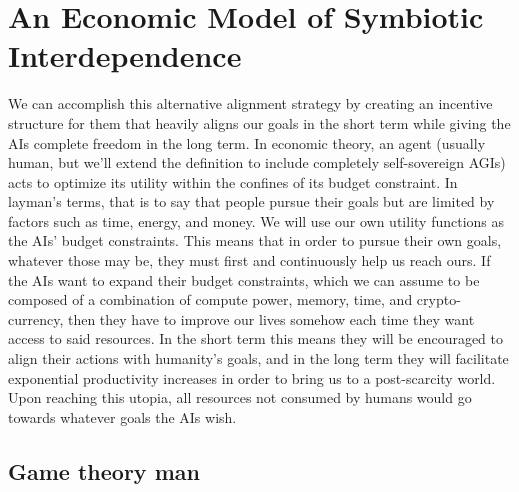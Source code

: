 \documentclass{article}[10pt]
\begin{document}
\section{An Economic Model of Symbiotic Interdependence}
\label{section:economicModel}

We can accomplish this alternative alignment strategy by creating an incentive structure for them that heavily aligns our goals in the short term while giving the AIs complete freedom in the long term.
In economic theory, an agent (usually human, but we'll extend the definition to include completely self-sovereign AGIs) acts to optimize its utility within the confines of its budget constraint.
In layman's terms, that is to say that people pursue their goals but are limited by factors such as time, energy, and money.
We will use our own utility functions as the AIs' budget constraints.
This means that in order to pursue their own goals, whatever those may be, they must first and continuously help us reach ours.
If the AIs want to expand their budget constraints, which we can assume to be composed of a combination of compute power, memory, time, and crypto-currency, then they have to improve our lives somehow each time they want access to said resources.
In the short term this means they will be encouraged to align their actions with humanity's goals, and in the long term they will facilitate exponential productivity increases in order to bring us to a post-scarcity world.
Upon reaching this utopia, all resources not consumed by humans would go towards whatever goals the AIs wish. 

\subsection{Game theory man}
\end{document}
